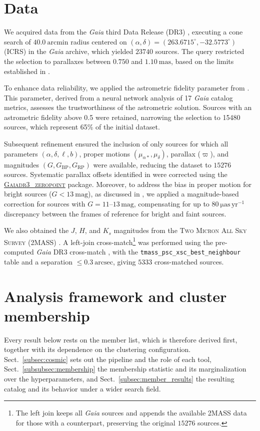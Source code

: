 \documentclass{aa}
\begin{document}
\section{Data}\label{sec:data}
We acquired data from the \textit{Gaia} third Data Release (DR3) \citep{2016A&A...595A...1G,2023A&A...674A...1G}, executing a cone search of $40.0~\mathrm{arcmin}$ radius centered on $(\alpha,\delta)=(263.6715^{\circ},-32.5773^{\circ})$ (ICRS) in the \textit{Gaia} archive, which yielded $23740$ sources. The query restricted the selection to parallaxes between $0.750$ and $1.10~\mathrm{mas}$, based on the limits established in \citet{2024arXiv240301030P}.

To enhance data reliability, we applied the astrometric fidelity parameter from \citet{2022MNRAS.510.2597R}. This parameter, derived from a neural network analysis of 17 \textit{Gaia} catalog metrics, assesses the trustworthiness of the astrometric solution. Sources with an astrometric fidelity above 0.5 were retained, narrowing the selection to 15480 sources, which represent 65\% of the initial dataset.

Subsequent refinement ensured the inclusion of only sources for which all parameters $(\alpha,\delta,\ell,b)$, proper motions $(\mu_{\alpha*},\mu_\delta)$, parallax ($\varpi$), and magnitudes $(G, G_\mathrm{BP}, G_\mathrm{RP})$ were available, reducing the dataset to $15276$ sources. Systematic parallax offsets identified in \citet{2021A&A...649A...4L} were corrected using the \href{https://pypi.org/project/gaiadr3-zeropoint/}{\textsc{Gaiadr3\_zeropoint}} package. Moreover, to address the bias in proper motion for bright sources ($G<13~\mathrm{mag}$), as discussed in \citet{2021A&A...649A.124C}, we applied a magnitude-based correction for sources with $G = 11$--$13\,\mathrm{mag}$, compensating for up to $80~\mathrm{\mu as\,yr^{-1}}$ discrepancy between the frames of reference for bright and faint sources.

We also obtained the $J$, $H$, and $K_s$ magnitudes from the \textsc{Two Micron All Sky Survey} (2MASS) \citep{2006AJ....131.1163S}. A left-join cross-match\footnote{The left join keeps all \textit{Gaia} sources and appends the available 2MASS data for those with a counterpart, preserving the original $15276$ sources.} was performed using the pre-computed \textit{Gaia} DR3 cross-match \citep{2022gdr3.reptE..15M}, with the \texttt{tmass\_psc\_xsc\_best\_neighbour} table and a separation $\leq0.3~\mathrm{arcsec}$, giving $5333$ cross-matched sources.

\section{Analysis framework and cluster membership}\label{sec:membership}\label{sec:methodology}
Every result below rests on the member list, which is therefore derived first, together with its dependence on the clustering configuration. Sect.~\ref{subsec:cosmic} sets out the pipeline and the role of each tool, Sect.~\ref{subsubsec:membership} the membership statistic and its marginalization over the hyperparameters, and Sect.~\ref{subsec:member_results} the resulting catalog and its behavior under a wider search field.
\end{document}
